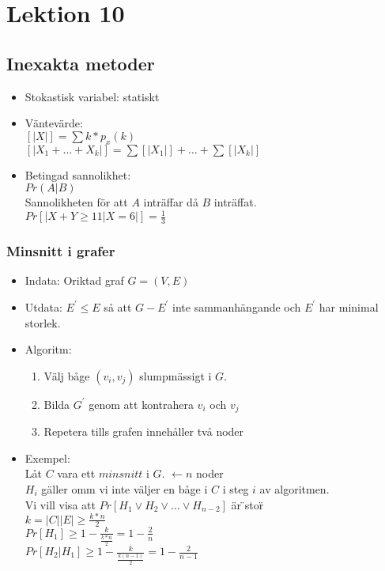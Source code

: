 \section{Lektion 10}

\subsection{Inexakta metoder}
\begin{itemize}
\item{Stokastisk variabel:
    statiskt
  }
\item{Väntevärde: \\ %
    \( [|X|] = \sum{k*p_x(k)} \) \\
    \( [|X_1 + \ldots + X_k|] = \sum{[|X_1|]} + \ldots + \sum{[|X_k|]}\)
  }
\item{Betingad sannolikhet: \\
    \(Pr(A|B)\) \\
    Sannolikheten för att $A$ inträffar då $B$ inträffat. \\
    \(Pr[|X + Y \geq 11 | X = 6 |] = \frac{1}{3}\) 
  }
\end{itemize}

\subsubsection{Minsnitt i grafer}
\begin{itemize}
\item{Indata: Oriktad graf \(G = (V,E)\)}
\item{Utdata: \(E^\prime \leq E\) så att \(G - E^\prime\) inte sammanhängande
    och $E^\prime$ har minimal storlek.}
\item{Algoritm:
    \begin{enumerate}
    \item{Välj båge \((v_i,v_j)\) slumpmässigt i $G$. }
    \item{Bilda $G^\prime$ genom att kontrahera $v_i$ och $v_j$}
    \item{Repetera tills grafen innehåller två noder}
    \end{enumerate}
  }
\item{Exempel: \\
    Låt $C$ vara ett $minsnitt$ i $G$. $\leftarrow n$ noder \\
    $H_i$ gäller omm vi inte väljer en båge i $C$ i steg $i$ av algoritmen. \\
    Vi vill visa att \( Pr[H_{1} \vee H_{2} \vee \ldots{} \vee H_{n-2} ]\) är \"{}stor\"{} \\
    \(k = |C|  |E| \geq \frac{k*n}{2}\) \\
    \(Pr[H_1] \geq 1 - \frac{k}{\frac{k*n}{2}} = 1 - \frac{2}{n}\) \\
    \(Pr[H_2 | H_1] \geq 1 - \frac{k}{\frac{k(n-1)}{2}} = 1 - \frac{2}{n-1}\) }
\end{itemize}

